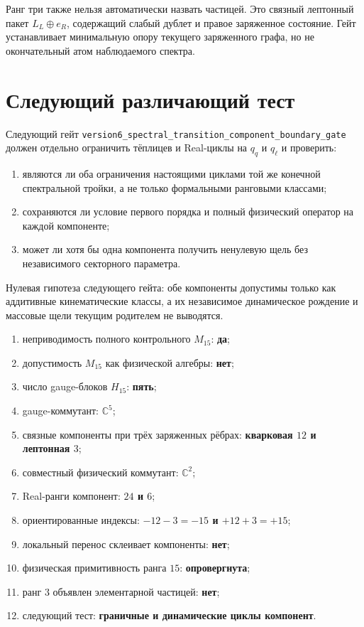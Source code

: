 \begin{remark}
Ранг три также нельзя автоматически назвать частицей. Это связный
лептонный пакет $L_L\oplus e_R$, содержащий слабый дублет и правое
заряженное состояние. Гейт устанавливает минимальную опору текущего
заряженного графа, но не окончательный атом наблюдаемого спектра.
\end{remark}

\section{Следующий различающий тест}

Следующий гейт
\texttt{version6\_spectral\_transition\_component\_boundary\_gate}
должен отдельно ограничить тёплицев и Real-циклы на $q_q$ и $q_\ell$ и
проверить:
\begin{enumerate}
 \item являются ли оба ограничения настоящими циклами той же конечной
 спектральной тройки, а не только формальными ранговыми классами;
 \item сохраняются ли условие первого порядка и полный физический
 оператор на каждой компоненте;
 \item может ли хотя бы одна компонента получить ненулевую щель без
 независимого секторного параметра.
\end{enumerate}
Нулевая гипотеза следующего гейта: обе компоненты допустимы только как
аддитивные кинематические классы, а их независимое динамическое рождение и
массовые щели текущим родителем не выводятся.

\begin{protocol}
\begin{enumerate}
 \item неприводимость полного контрольного $M_{15}$: \textbf{да};
 \item допустимость $M_{15}$ как физической алгебры: \textbf{нет};
 \item число gauge-блоков $H_{15}$: \textbf{пять};
 \item gauge-коммутант: \textbf{$\mathbb C^5$};
 \item связные компоненты при трёх заряженных рёбрах:
 \textbf{кварковая $12$ и лептонная $3$};
 \item совместный физический коммутант: \textbf{$\mathbb C^2$};
 \item Real-ранги компонент: \textbf{$24$ и $6$};
 \item ориентированные индексы: \textbf{$-12-3=-15$ и
 $+12+3=+15$};
 \item локальный перенос склеивает компоненты: \textbf{нет};
 \item физическая примитивность ранга $15$: \textbf{опровергнута};
 \item ранг $3$ объявлен элементарной частицей: \textbf{нет};
 \item следующий тест: \textbf{граничные и динамические циклы компонент}.
\end{enumerate}
\end{protocol}


